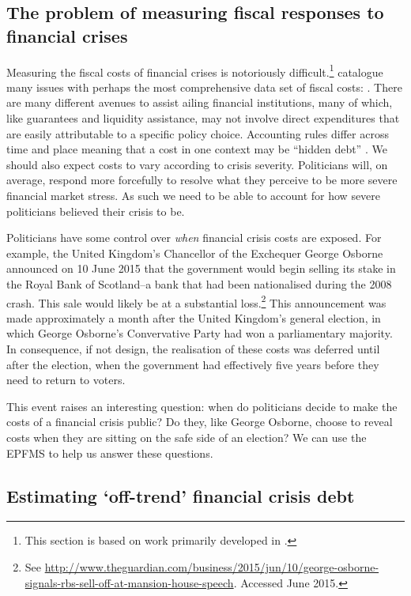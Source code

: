 \documentclass[]{article}
\begin{document}
\subsection{The problem of measuring fiscal responses to financial crises}

Measuring the fiscal costs of financial crises is notoriously difficult.\footnote{This section is based on work primarily developed in \cite{gandrudHallerbergPBC}.} \cite{GandrudHallerberg2015} catalogue many issues with perhaps the most comprehensive data set of fiscal costs: \cite[and their predecessors]{laeven2013}. There are many different avenues to assist ailing financial institutions, many of which, like guarantees and liquidity assistance, may not involve direct expenditures that are easily attributable to a specific policy choice. Accounting rules differ across time and place \citep{gandrudHallerbergWEP} meaning that a cost in one context may be ``hidden debt'' \citep{reinhartRogoff2011}. We should also expect costs to vary according to crisis severity. Politicians will, on average, respond more forcefully to resolve what they perceive to be more severe financial market stress. As such we need to be able to account for how severe politicians believed their crisis to be.

Politicians have some control over \emph{when} financial crisis costs are exposed. For example, the United Kingdom's Chancellor of the Exchequer George Osborne announced on 10 June 2015 that the government would begin selling its stake in the Royal Bank of Scotland--a bank that had been nationalised during the 2008 crash. This sale would likely be at a substantial loss.\footnote{See \url{http://www.theguardian.com/business/2015/jun/10/george-osborne-signals-rbs-sell-off-at-mansion-house-speech}. Accessed June 2015.} This announcement was made approximately a month after the United Kingdom's general election, in which George Osborne's Convervative Party had won a parliamentary majority. In consequence, if not design, the realisation of these costs was deferred until after the election, when the government had effectively five years before they need to return to voters.

This event raises an interesting question: when do politicians decide to make the costs of a financial crisis public? Do they, like George Osborne, choose to reveal costs when they are sitting on the safe side of an election? We can use the EPFMS to help us answer these questions.

\subsection{Estimating `off-trend' financial crisis debt}
\end{document}
